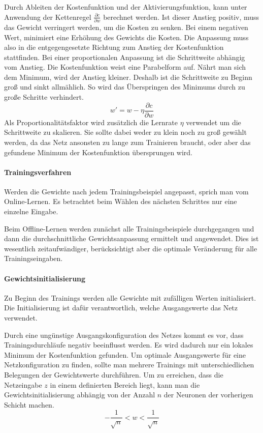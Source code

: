 \documentclass[12pt, a4paper]{article}
\begin{document}
Durch Ableiten der Kostenfunktion und der Aktivierungsfunktion, kann unter Anwendung der Kettenregel  \(\frac{\partial c}{\partial w}\)  berechnet werden. Ist dieser Anstieg positiv, muss das Gewicht verringert werden, um die Kosten zu senken. Bei einem negativen Wert, minimiert eine Erhöhung des Gewichts die Kosten. Die Anpassung muss also in die entgegengesetzte Richtung zum Anstieg der Kostenfunktion stattfinden. Bei einer proportionalen Anpassung ist die Schrittweite abhängig vom Anstieg. Die Kostenfunktion weist eine Parabelform auf. Nährt man sich dem Minimum, wird der Anstieg kleiner. Deshalb ist die Schrittweite zu Beginn groß und sinkt allmählich. So wird das Überspringen des Minimums durch zu große Schritte verhindert.
\[w' = w - \eta \frac{\partial c}{\partial w}\]
Als Proportionalitätsfaktor wird zusätzlich die Lernrate \(\eta\) verwendet um die Schrittweite zu skalieren. Sie sollte dabei weder zu klein noch zu groß gewählt werden, da das Netz ansonsten zu lange zum Trainieren braucht, oder aber das gefundene Minimum der Kostenfunktion übersprungen wird.

\paragraph{Trainingsverfahren}
Werden die Gewichte nach jedem Trainingsbeispiel angepasst, sprich man vom Online-Lernen. Es betrachtet beim Wählen des nächsten Schrittes nur eine einzelne Eingabe. 

Beim Offline-Lernen werden zunächst alle Trainingsbeispiele durchgegangen und dann die durchschnittliche Gewichtsanpassung ermittelt und angewendet. Dies ist wesentlich zeitaufwändiger, berücksichtigt aber die optimale Veränderung für alle Trainingseingaben. 

\paragraph{Gewichtsinitialisierung}
Zu Beginn des Trainings werden alle Gewichte mit zufälligen Werten initialisiert. Die Initialisierung ist dafür verantwortlich, welche Ausgangswerte das Netz verwendet.

Durch eine ungünstige Ausgangskonfiguration des Netzes kommt es vor, dass Trainingsdurchläufe negativ beeinflusst werden. Es wird dadurch nur ein lokales Minimum der Kostenfunktion gefunden. Um optimale Ausgangswerte für eine Netzkonfiguration zu finden, sollte man mehrere Trainings mit unterschiedlichen Belegungen der Gewichtswerte durchführen.
Um zu erreichen, dass die Netzeingabe \(z\) in einem definierten Bereich liegt, kann man die Gewichtsinitialisierung abhängig von der Anzahl \(n\) der Neuronen der vorherigen Schicht machen.
\[-\frac{1}{\sqrt{n}} < w < \frac{1}{\sqrt{n}}\]
\end{document}
